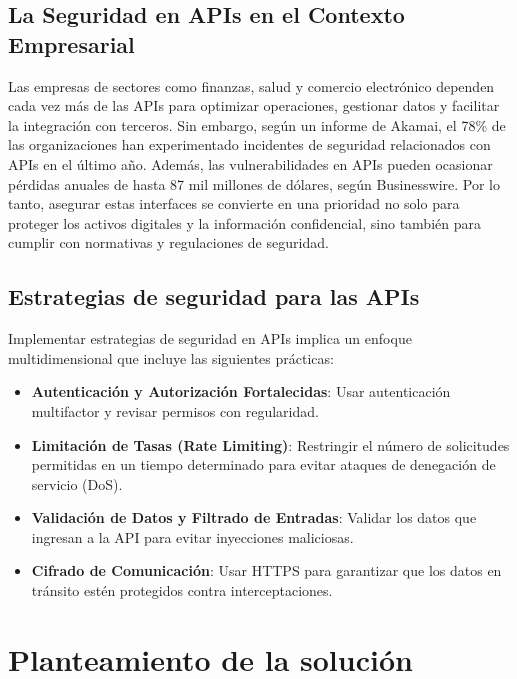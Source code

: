 \documentclass{article}
\begin{document}
    \subsection{La Seguridad en APIs en el Contexto Empresarial}
    Las empresas de sectores como finanzas, salud y comercio electrónico dependen cada vez más de las APIs para optimizar operaciones, gestionar datos y facilitar la integración con terceros. Sin embargo, según un informe de Akamai, el 78\% de las organizaciones han experimentado incidentes de seguridad relacionados con APIs en el último año. Además, las vulnerabilidades en APIs pueden ocasionar pérdidas anuales de hasta 87 mil millones de dólares, según Businesswire. Por lo tanto, asegurar estas interfaces se convierte en una prioridad no solo para proteger los activos digitales y la información confidencial, sino también para cumplir con normativas y regulaciones de seguridad.

    \subsection{Estrategias de seguridad para las APIs}
    Implementar estrategias de seguridad en APIs implica un enfoque multidimensional que incluye las siguientes prácticas:

    \begin{itemize}
        \item \textbf{Autenticación y Autorización Fortalecidas}: Usar autenticación multifactor y revisar permisos con regularidad.
        \item \textbf{Limitación de Tasas (Rate Limiting)}: Restringir el número de solicitudes permitidas en un tiempo determinado para evitar ataques de denegación de servicio (DoS).
        \item \textbf{Validación de Datos y Filtrado de Entradas}: Validar los datos que ingresan a la API para evitar inyecciones maliciosas.
        \item \textbf{Cifrado de Comunicación}: Usar HTTPS para garantizar que los datos en tránsito estén protegidos contra interceptaciones.
    \end{itemize}

    \newpage
    \section{Planteamiento de la solución}
\end{document}

